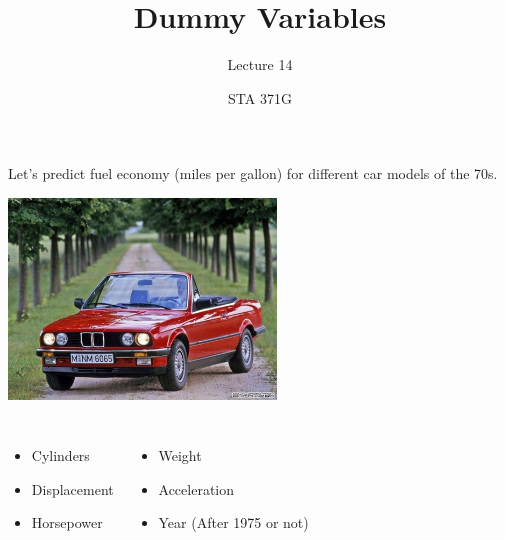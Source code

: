 \documentclass{beamer}\usepackage[]{graphicx}\usepackage[]{color}
\title{Dummy Variables}
\subtitle{Lecture 14}
\author{STA 371G}
\begin{document}
  
  
  

  \frame{\maketitle}



  \begin{darkframes}
    \begin{frame}
      \fontsize{9}{9}\selectfont
      Let's predict fuel economy (miles per gallon) for different car models of the 70s.
      
      \begin{center}
        \includegraphics[width=2.8in]{bmw} \\
      \end{center} \pause
      
      \begin{columns}[onlytextwidth]
          \begin{itemize}
            \item Cylinders
            \item Displacement
            \item Horsepower
          \end{itemize}
          \begin{itemize}
            \item Weight
            \item Acceleration
            \item Year (After 1975 or not)
          \end{itemize}
      \end{columns}
    \end{frame}
    

\end{darkframes}
\end{document}
